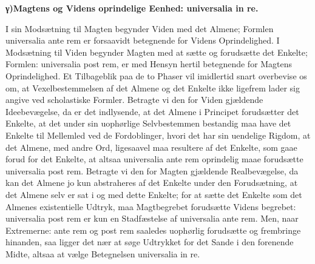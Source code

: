 \documentclass[12pt]{book}
\newcommand{\opage}[1]{\marginnote{\footnotesize\textit{[#1]}}}
\begin{document}
\begin{center}{\bfseries γ)\quad Magtens og Videns oprindelige Eenhed: universalia in re.}\end{center}

I sin Modsætning til Magten begynder Viden med det Almene; Formlen universalia ante rem er
forsaavidt betegnende for Videns Oprindelighed. I Modsætning til Viden begynder Magten med at sætte
og forudsætte det Enkelte; Formlen: universalia post rem, er med Hensyn hertil betegnende for
Magtens Oprindelighed. Et Tilbageblik paa de to Phaser vil imidlertid snart overbevise os om, at
Vexelbestemmelsen af det Almene og det Enkelte ikke ligefrem lader sig angive ved scholastiske
Formler. Betragte vi den for Viden gjældende Ideebevægelse, da er det indlysende, at det Almene i
Principet forudsætter det Enkelte, at det under sin uophørlige Selvbestemmen bestandig maa have det
Enkelte til Mellemled ved de Fordoblinger, hvori det har sin uendelige Rigdom, at det Almene, med
andre Ord, ligesaavel maa resultere af det Enkelte, som gaae forud for det Enkelte, at altsaa
universalia ante rem oprindelig maae forudsætte universalia post rem. Betragte vi den for Magten
gjældende Realbevægelse, da kan det Almene jo kun abstraheres af det Enkelte under den Forudsætning,
at det Almene selv er sat i og med dette Enkelte; for at sætte det Enkelte som det Almenes
existentielle Udtryk, maa Magtbegrebet forudsætte Videns%
\opage{208} begrebet: universalia post rem er kun en Stadfæstelse af universalia ante rem. Men, naar Extremerne:
ante rem og post rem saaledes uophørlig forudsætte og frembringe hinanden, saa ligger det nær at
søge Udtrykket for det Sande i den forenende Midte, altsaa at vælge Betegnelsen universalia in re.
\end{document}
